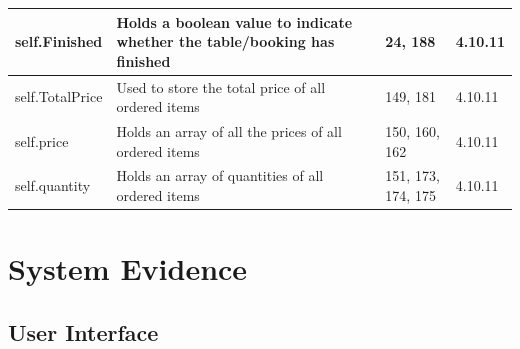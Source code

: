 \begin{center}
\begin{longtable}{|p{3cm}|p{4.5cm}|p{3cm}|p{1cm}|}
self.Finished & Holds a boolean value to indicate whether the table/booking has finished &24, 188 & 4.10.11 \\ \hline
self.TotalPrice & Used to store the total price of all ordered items& 149, 181 &4.10.11 \\ \hline
self.price & Holds an array of all the prices of all ordered items&150, 160, 162 &4.10.11 \\ \hline
self.quantity & Holds an array of quantities of all ordered items & 151, 173, 174, 175 & 4.10.11\\ \hline



\end{longtable}
\end{center}

\section{System Evidence}

\subsection{User Interface}

